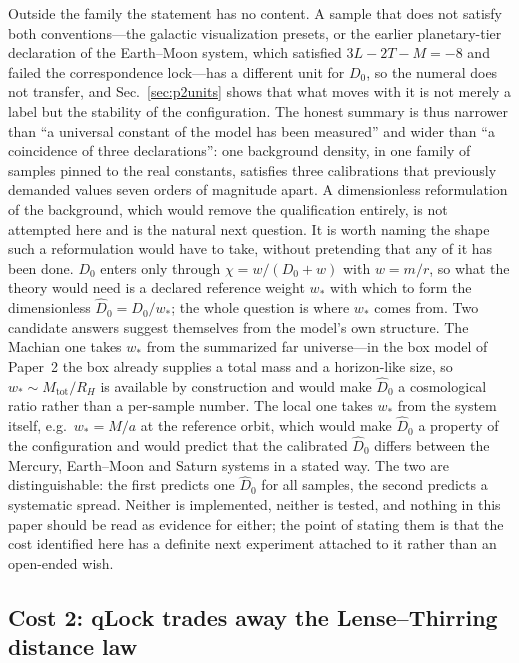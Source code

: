 \documentclass[aps,reprint,amsmath,amssymb,nofootinbib,superscriptaddress,floatfix]{revtex4-2}
\begin{document}
Outside the family the statement has no content.
A sample that does not satisfy both conventions---the galactic
visualization presets, or the earlier planetary-tier declaration of the
Earth--Moon system, which satisfied $3L-2T-M=-8$ and failed the
correspondence lock---has a different unit for $D_0$, so the numeral
does not transfer, and Sec.~\ref{sec:p2units} shows that what moves
with it is not merely a label but the stability of the configuration.
The honest summary is thus narrower than ``a universal constant of the
model has been measured'' and wider than ``a coincidence of three
declarations'': one background density, in one family of samples
pinned to the real constants, satisfies three calibrations that
previously demanded values seven orders of magnitude apart.
A dimensionless reformulation of the background, which would remove the
qualification entirely, is not attempted here and is the natural next
question.
It is worth naming the shape such a reformulation would have to take,
without pretending that any of it has been done.
$D_0$ enters only through $\chi=w/(D_0+w)$ with $w=m/r$, so what the
theory would need is a declared reference weight $w_{\ast}$ with which
to form the dimensionless $\hat D_0=D_0/w_{\ast}$; the whole question is
where $w_{\ast}$ comes from.
Two candidate answers suggest themselves from the model's own
structure.
The Machian one takes $w_{\ast}$ from the summarized far universe---in
the box model of Paper~2 the box already supplies a total mass and a
horizon-like size, so $w_{\ast}\sim M_{\mathrm{tot}}/R_{H}$ is available
by construction and would make $\hat D_0$ a cosmological ratio rather
than a per-sample number.
The local one takes $w_{\ast}$ from the system itself, e.g.\
$w_{\ast}=M/a$ at the reference orbit, which would make $\hat D_0$
a property of the configuration and would predict that the calibrated
$\hat D_0$ differs between the Mercury, Earth--Moon and Saturn systems
in a stated way.
The two are distinguishable: the first predicts one $\hat D_0$ for all
samples, the second predicts a systematic spread.
Neither is implemented, neither is tested, and nothing in this paper
should be read as evidence for either; the point of stating them is
that the cost identified here has a definite next experiment attached to
it rather than an open-ended wish.

\subsection{Cost 2: qLock trades away the Lense--Thirring distance
  law}
\label{sec:cost2}
\end{document}
